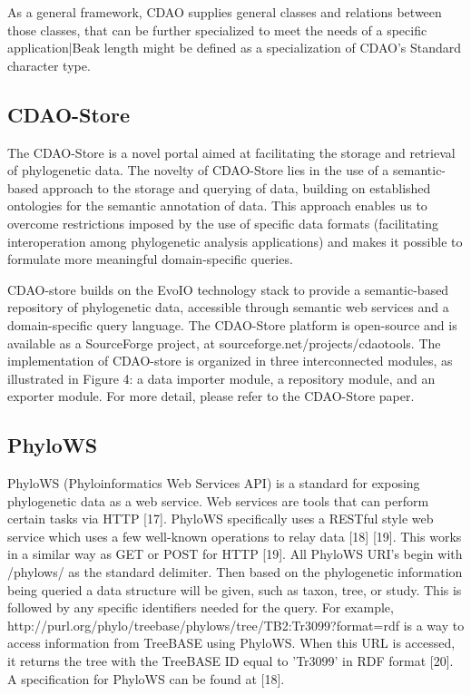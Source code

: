 \documentclass[10pt]{article}
\begin{document}
As a general framework, CDAO supplies general classes and relations between
those classes, that can be further specialized to meet the needs of a specific
application|Beak length might be defined as a specialization of CDAO's Standard
character type.

\subsection{CDAO-Store}
The CDAO-Store is a novel portal aimed at facilitating the storage and
retrieval of phylogenetic data. The novelty of CDAO-Store lies in the use of a
semantic-based approach to the storage and querying of data, building on
established ontologies for the semantic annotation of data. This approach
enables us to overcome restrictions imposed by the use of specific data formats
(facilitating interoperation among phylogenetic analysis applications) and
makes it possible to formulate more meaningful domain-specific queries.

CDAO-store builds on the EvoIO technology stack to provide a semantic-based
repository of phylogenetic data, accessible through semantic web services and a
domain-specific query language. The CDAO-Store platform is open-source and is
available as a SourceForge project, at sourceforge.net/projects/cdaotools.  The
implementation of CDAO-store is organized in three interconnected modules, as
illustrated in Figure 4: a data importer module, a repository module, and an
exporter module.  For more detail, please refer to the CDAO-Store paper.

\subsection{PhyloWS}
PhyloWS (Phyloinformatics Web Services API) is a standard for exposing
phylogenetic data as a web service. Web services are tools that can perform
certain tasks via HTTP [17]. PhyloWS specifically uses a RESTful style web
service which uses a few well-known operations to relay data [18] [19]. This
works in a similar way as GET or POST for HTTP [19].  All PhyloWS URI's begin
with /phylows/ as the standard delimiter. Then based on the phylogenetic
information being queried a data structure will be given, such as taxon, tree,
or study.  This is followed by any specific identifiers needed for the query.
For example, http://purl.org/phylo/treebase/phylows/tree/TB2:Tr3099?format=rdf
is a way to access information from TreeBASE using PhyloWS. When this URL is
accessed, it returns the tree with the TreeBASE ID equal to 'Tr3099' in RDF
format [20]. A specification for PhyloWS can be found at [18].
\end{document}

